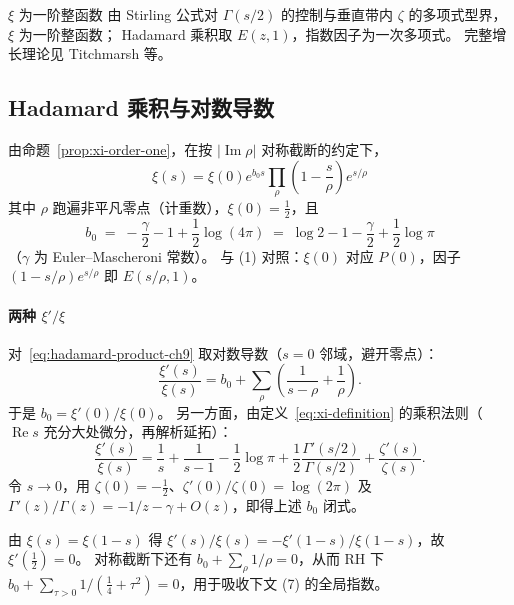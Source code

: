 \begin{proposition}{\texorpdfstring{$\xi$}{xi} 为一阶整函数}{}
\label{prop:xi-order-one}
由 Stirling 公式对 $\Gamma(s/2)$ 的控制与垂直带内 $\zeta$ 的多项式型界，$\xi$ 为一阶整函数；
Hadamard 乘积取 $E(z,1)$，指数因子为一次多项式。
完整增长理论见 Titchmarsh 等。
\end{proposition}

\subsection{Hadamard 乘积与对数导数}
\label{sec:xi-to-zeta-logderiv}

由命题~\ref{prop:xi-order-one}，在按 $|\operatorname{Im}\rho|$ 对称截断的约定下，
\begin{equation}
\boxed{
\xi(s) = \xi(0) e^{b_0 s} \prod_{\rho} \left(1 - \frac{s}{\rho}\right) e^{s/\rho}
}
\label{eq:hadamard-product-ch9}
\tag{4}
\end{equation}
其中 $\rho$ 跑遍非平凡零点（计重数），$\xi(0)=\frac12$，且
\[
  b_0
  \;=\;
  -\frac{\gamma}{2}-1+\frac12\log(4\pi)
  \;=\;
  \log 2-1-\frac{\gamma}{2}+\frac12\log\pi
\]
（$\gamma$ 为 Euler--Mascheroni 常数）。
与 (1) 对照：$\xi(0)$ 对应 $P(0)$，因子 $(1-s/\rho)e^{s/\rho}$ 即 $E(s/\rho,1)$。

\paragraph{两种 $\xi'/\xi$}
对~\eqref{eq:hadamard-product-ch9} 取对数导数（$s=0$ 邻域，避开零点）：
\begin{equation}
\frac{\xi'(s)}{\xi(s)} = b_0 + \sum_{\rho} \left( \frac{1}{s - \rho} + \frac{1}{\rho} \right).
\label{eq:xi-log-derivative}
\tag{5}
\end{equation}
于是 $b_0=\xi'(0)/\xi(0)$。
另一方面，由定义~\eqref{eq:xi-definition} 的乘积法则（$\operatorname{Re}s$ 充分大处微分，再解析延拓）：
\begin{equation}
  \frac{\xi'(s)}{\xi(s)}
  =
  \frac{1}{s}+\frac{1}{s-1}
  -\frac12\log\pi
  +\frac12\frac{\Gamma'(s/2)}{\Gamma(s/2)}
  +\frac{\zeta'(s)}{\zeta(s)}.
  \label{eq:xi-logderiv-from-def}
\end{equation}
令 $s\to 0$，用 $\zeta(0)=-\frac12$、$\zeta'(0)/\zeta(0)=\log(2\pi)$ 及
$\Gamma'(z)/\Gamma(z)=-1/z-\gamma+O(z)$，即得上述 $b_0$ 闭式。

由 $\xi(s)=\xi(1-s)$ 得 $\xi'(s)/\xi(s)=-\xi'(1-s)/\xi(1-s)$，故 $\xi'(\frac12)=0$。
对称截断下还有 $b_0+\sum_{\rho}1/\rho=0$，从而 RH 下
$b_0+\sum_{\tau>0}1/(\tfrac14+\tau^2)=0$，用于吸收下文 (7) 的全局指数。

